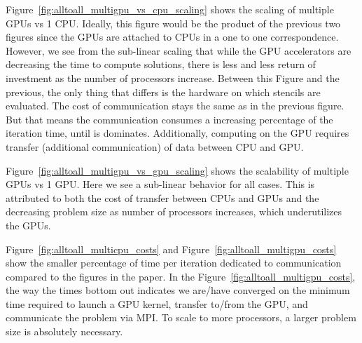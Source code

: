 Figure~\ref{fig:alltoall_multigpu_vs_cpu_scaling}  shows the scaling of multiple GPUs vs 1 CPU. Ideally, this figure would be the product of the previous two figures since the GPUs are attached to CPUs in a one to one correspondence. However, we see from the sub-linear scaling that while the GPU accelerators are decreasing the time to compute solutions, there is less and less return of investment as the number of processors increase. Between this Figure and the previous, the only thing that differs is the hardware on which stencils are evaluated. The cost of communication stays the same as in the previous figure. But that means the communication consumes a increasing percentage of the iteration time, until is dominates. 
Additionally, computing on the GPU requires transfer (additional communication) of data between CPU and GPU. 

Figure~\ref{fig:alltoall_multigpu_vs_gpu_scaling} shows the scalability of multiple GPUs vs 1 GPU. Here we see a sub-linear behavior for all cases. This is attributed to both the cost of transfer between CPUs and GPUs and the decreasing problem size as number of processors increases, which underutilizes the GPUs. 


Figure~\ref{fig:alltoall_multicpu_costs} and Figure~\ref{fig:alltoall_multigpu_costs} show the smaller percentage of time per iteration dedicated to communication compared to the figures in the paper. In the Figure~\ref{fig:alltoall_multigpu_costs}, the way the times bottom out indicates we are/have converged on the minimum time required to launch a GPU kernel, transfer to/from the GPU, and communicate the problem via MPI. To scale to more processors, a larger problem size is absolutely necessary.



%    

%
%

